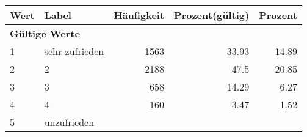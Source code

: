      \begin{longtable}{lXrrr}
     \toprule
     \textbf{Wert} & \textbf{Label} & \textbf{Häufigkeit} & \textbf{Prozent(gültig)} & \textbf{Prozent} \\
     \endhead
     \midrule
     \multicolumn{5}{l}{\textbf{Gültige Werte}}\\

     1 &
     \multicolumn{1}{X}{ sehr zufrieden   } &


       \num{1563} &
       \num[round-mode=places,round-precision=2]{33,93} &
         \num[round-mode=places,round-precision=2]{14,89} \\

     2 &
     \multicolumn{1}{X}{ 2   } &


       \num{2188} &
       \num[round-mode=places,round-precision=2]{47,5} &
         \num[round-mode=places,round-precision=2]{20,85} \\

     3 &
     \multicolumn{1}{X}{ 3   } &


       \num{658} &
       \num[round-mode=places,round-precision=2]{14,29} &
         \num[round-mode=places,round-precision=2]{6,27} \\

     4 &
     \multicolumn{1}{X}{ 4   } &


       \num{160} &
       \num[round-mode=places,round-precision=2]{3,47} &
         \num[round-mode=places,round-precision=2]{1,52} \\

     5 &
     \multicolumn{1}{X}{ unzufrieden   } &



\end{longtable}
